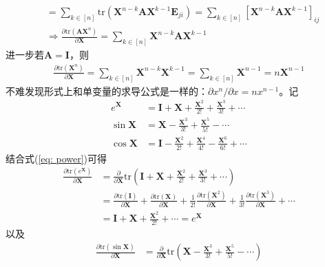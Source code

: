 \documentclass{ctexart}
\theoremstyle{definition}
\def \Av {\mathbf{A}}
\def \Ev {\mathbf{E}}
\def \Iv {\mathbf{I}}
\def \Xv {\mathbf{X}}
\def \tr {\mathrm{tr}}
\begin{document}
\begin{itemize}
\begin{align*}
                                                                               & = \sum_{k \in [n]} \tr ( \Xv^{n-k} \Av \Xv^{k-1} \Ev_{ji} ) = \sum_{k \in [n]} [\Xv^{n-k} \Av \Xv^{k-1}]_{ij}                                                                                                                                                         \\
                                                                               & \Longrightarrow \frac{\partial \tr(\Av \Xv^n)}{\partial \Xv} = \sum_{k \in [n]} \Xv^{n-k} \Av \Xv^{k-1}
          \end{align*}
          进一步若$\Av = \Iv$，则
          \begin{align*}
              \frac{\partial \tr(\Xv^n)}{\partial \Xv} = \sum_{k \in [n]} \Xv^{n-k} \Xv^{k-1} = \sum_{k \in [n]} \Xv^{n-1} = n \Xv^{n-1}
          \end{align*}
          不难发现形式上和单变量的求导公式是一样的：$\partial x^n / \partial x = n x^{n-1}$。记
          \begin{align*}
              e^{\Xv}  & = \Iv + \Xv + \frac{\Xv^2}{2!} + \frac{\Xv^3}{3!} + \cdots              \\
              \sin \Xv & = \Xv - \frac{\Xv^3}{3!} + \frac{\Xv^5}{5!} - \cdots                    \\
              \cos \Xv & = \Iv - \frac{\Xv^2}{2!} + \frac{\Xv^4}{4!} - \frac{\Xv^6}{6!} + \cdots
          \end{align*}
          结合式(\ref{eq: power})可得
          \begin{align*}
              \frac{\partial \tr(e^{\Xv})}{\partial \Xv} & = \frac{\partial }{\partial \Xv} \tr \left( \Iv + \Xv + \frac{\Xv^2}{2!} + \frac{\Xv^3}{3!} + \cdots \right)                                                                                                   \\
                                                         & = \frac{\partial \tr (\Iv)}{\partial \Xv} + \frac{\partial \tr (\Xv)}{\partial \Xv} + \frac{1}{2!} \frac{\partial \tr (\Xv^2)}{\partial \Xv} + \frac{1}{3!} \frac{\partial \tr (\Xv^3)}{\partial \Xv} + \cdots \\
                                                         & = \Iv + \Xv + \frac{\Xv^2}{2!} + \cdots = e^{\Xv}
          \end{align*}
          以及
          \begin{align*}
              \frac{\partial \tr(\sin \Xv)}{\partial \Xv} & = \frac{\partial }{\partial \Xv} \tr \left( \Xv - \frac{\Xv^3}{3!} + \frac{\Xv^5}{5!} - \cdots \right)                                                                                                                        \\

\end{align*}
\end{itemize}
\end{document}
